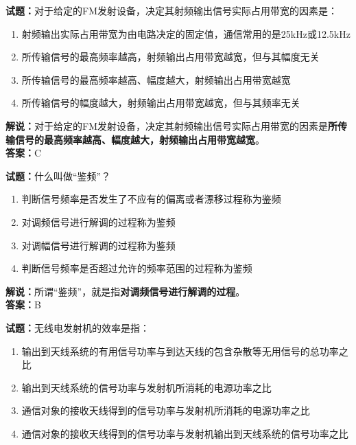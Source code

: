 \documentclass{ctexbook}
\begin{document}
\bigskip


\noindent\textbf{试题：}对于给定的FM发射设备，决定其射频输出信号实际占用带宽的因素是：

\begin{enumerate}[leftmargin=3em]
	\item 射频输出实际占用带宽为由电路决定的固定值，通信常用的是25kHz或12.5kHz
	\item 所传输信号的最高频率越高，射频输出占用带宽越宽，但与其幅度无关
	\item 所传输信号的最高频率越高、幅度越大，射频输出占用带宽越宽
	\item 所传输信号的幅度越大，射频输出占用带宽越宽，但与其频率无关
\end{enumerate}

\noindent\textbf{解说：}对于给定的FM发射设备，决定其射频输出信号实际占用带宽的因素是\textbf{所传输信号的最高频率越高、幅度越大，射频输出占用带宽越宽}。\\\noindent\textbf{答案：}C%


\bigskip


\noindent\textbf{试题：}什么叫做“鉴频”？

\begin{enumerate}[leftmargin=3em]
	\item 判断信号频率是否发生了不应有的偏离或者漂移过程称为鉴频
	\item 对调频信号进行解调的过程称为鉴频
	\item 对调幅信号进行解调的过程称为鉴频
	\item 判断信号频率是否超过允许的频率范围的过程称为鉴频
\end{enumerate}

\noindent\textbf{解说：}所谓“鉴频”，就是指\textbf{对调频信号进行解调的过程}。\\\noindent\textbf{答案：}B


\bigskip


\noindent\textbf{试题：}无线电发射机的效率是指：

\begin{enumerate}[leftmargin=3em]
	\item 输出到天线系统的有用信号功率与到达天线的包含杂散等无用信号的总功率之比
	\item 输出到天线系统的信号功率与发射机所消耗的电源功率之比
	\item 通信对象的接收天线得到的信号功率与发射机所消耗的电源功率之比
	\item 通信对象的接收天线得到的信号功率与发射机输出到天线系统的信号功率之比
\end{enumerate}
\end{document}
